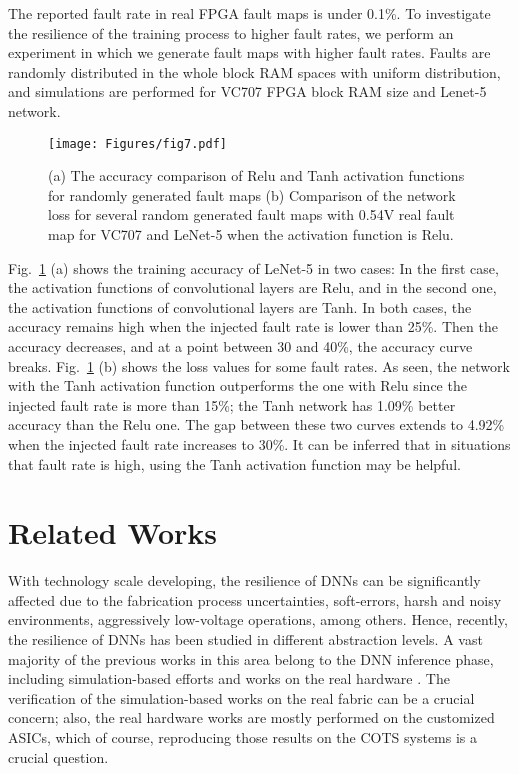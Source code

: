 \documentclass[conference]{IEEEtran}
\begin{document}
\color{black}


The reported fault rate in real FPGA fault maps is under 0.1\%. To investigate the resilience of the training process to higher fault rates, we perform an experiment in which we generate fault maps with higher fault rates. \color{black} Faults are randomly distributed in the whole block RAM spaces with uniform distribution, and simulations are performed for VC707 FPGA block RAM size and Lenet-5 network. \color{black}
 \begin{figure}[h]
 \centering
\centerline{    \texttt{[image: Figures/fig7.pdf]}}
\caption{ (a) The accuracy comparison of Relu and Tanh activation functions for randomly generated fault maps (b) Comparison of the network loss for several random generated fault maps with  0.54V real fault map for VC707 and LeNet-5 when the activation function is Relu.}
\label{fig:rand}
\end{figure}

 Fig.~\ref{fig:rand} (a) shows the training accuracy of LeNet-5 in two cases: In the first case, the activation functions of convolutional layers are Relu, and in the second one, the activation functions of convolutional layers are Tanh. In both cases, the accuracy remains high when the injected fault rate is lower than 25\%. Then the accuracy decreases, and at a point between 30 and 40\%, the accuracy curve breaks. Fig.~\ref{fig:rand} (b) shows the loss values for some fault rates. \color{black} As seen, the network with the Tanh activation function outperforms the one with Relu since the injected fault rate is more than 15\%; the Tanh network has 1.09\% better accuracy than the Relu one. The gap between these two curves extends to 4.92\% when the injected fault rate increases to 30\%. It can be inferred that in situations that fault rate is high, using the Tanh activation function may be helpful.

\color{black}

\section{Related Works}
\label{sec:related}


With technology scale developing, the resilience of DNNs can be significantly affected due to the fabrication process uncertainties, soft-errors, harsh and noisy environments, aggressively low-voltage operations, among others. Hence, recently, the resilience of DNNs has been studied in different abstraction levels. A vast majority of the previous works in this area belong to the DNN inference phase, including simulation-based efforts \cite{zhang2019fault, li2017understanding, choi2019sensitivity, salami2018resilience} and works on the real hardware \cite{zhang2018thundervolt, reagen2016minerva, pandey2019greentpu, chandramoorthy2019resilient}. The verification of the simulation-based works on the real fabric can be a crucial concern; also, the real hardware works are mostly performed on the customized ASICs, which of course, reproducing those results on the COTS systems is a crucial question. 
\end{document}

